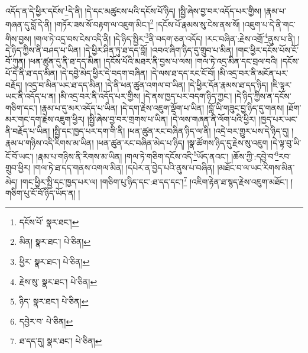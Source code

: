 འདོད་ན་དེ་ཕྱིར་དངོས་\footnote{དངོས་པོ་  སྣར་ཐང་། }དེ་ནི། །དེ་དང་མཚུངས་པའི་དངོས་པོ་ཉིད། །སྤྱི་ཞེས་བྱ་བར་འདོད་པར་གྱིས། །རྣམ་པ་གཞན་དུ་བློ་དེ་ནི། །གཏོར་ཟས་སོ་བརྟག་ལ་འཇུག་མིང་།\footnote{མིན།  སྣར་ཐང་།  པེ་ཅིན། } །དངོས་པོ་རྣམས་སུ་ངེས་ནས་སོ། །འཇུག་པ་དེ་ནི་གང་གིས་བྱས། །གལ་ཏེ་འདྲ་བས་ངེས་འདི་ནི། །དེ་ཉིད་སྤྱིར་\footnote{ཕྱིར་  སྣར་ཐང་།  པེ་ཅིན། }ནི་བདག་ཅན་འདོད། །རང་བཞིན་:རྗེས་འགྲོ་\footnote{རྗེས་སུ་  སྣར་ཐང་།  པེ་ཅིན། }ནུས་པ་ནི། །དེ་ཉིད་ཀྱིས་ནི་བཤད་པ་ཡིན། །དེ་ཕྱིར་ཤིན་ཏུ་ཐ་དད་བློ། །འབའ་ཞིག་ཉིད་དུ་གྲུབ་པ་མིན། །གང་ཕྱིར་དངོས་པོས་ངོ་བོ་ཀུན། །ཕན་ཚུན་དུ་ནི་ཐ་དད་མིན། །དངོས་པོའི་མཐར་ནི་བྱས་པ་ལས། །གལ་ཏེ་འདྲ་མིན་དང་བྲལ་བའི། །དངོས་པོ་དེ་ནི་ཐ་དད་མིན། །དེ་དབྱེ་མེད་ཕྱིར་དེ་བདག་བཞིན། །དེ་ལས་ཐ་དད་རང་ངོ་བོ། །མི་འདྲ་བར་ནི་མངོན་པར་བརྗོད། །འདྲ་བ་མིན་ཡང་ཐ་དད་མིན། །དེ་ནི་ཕན་ཚུན་འགལ་བ་ཡིན། །དེ་ཕྱིར་དོན་རྣམས་ཐ་དད་ཉིད། །ཇི་ལྟར་ཡང་ནི་འདོད་པ་ན། །མི་འདྲ་བར་ནི་འདོད་པར་གྱིས། །དེ་ནས་ཁྱད་པར་བདག་ཉིད་ཀྱང་། །དེ་ཉིད་ཀྱིས་ན་དངོས་གཅིག་དང་། །རྣམ་པ་དུ་མར་འདོད་པ་ཡིན། །དེ་དག་རྗེས་འཇུག་ལྡོག་པ་ཡིན། །བློ་ཡི་གཟུང་བྱ་ཉིད་དུ་གནས། །ཐོག་མར་གང་དག་རྗེས་འཇུག་ཕྱིར། །སྤྱི་ཞེས་བྱ་བར་གྲགས་པ་ཡིན། །དེ་ལས་གཞན་ནི་ལོག་པའི་ཕྱིར། །ཁྱད་པར་ཡང་ནི་བརྗོད་པ་ཡིན། །སྤྱི་དང་ཁྱད་པར་དག་གི་ནི། །ཕན་ཚུན་རང་བཞིན་ཉིད་ལ་ནི། །འདྲེ་བར་གྱུར་པས་དེ་ཉིད་དུ། །རྣམ་པ་གཉིས་འདི་རིགས་མ་ཡིན། །ཕན་ཚུན་རང་བཞིན་མེད་པ་ཉིད། །སྣ་ཚོགས་ཉིད་དུ་རྗེས་སུ་འཇུག །དེ་ལྟ་བུ་ཡི་ངོ་བོ་ཡང་། །རྣམ་པ་གཉིས་ནི་རིགས་མ་ཡིན། །གལ་ཏེ་གཅིག་དངོས་འདི་\footnote{ཉིད་  སྣར་ཐང་།  པེ་ཅིན། }ཡོད་ནའང་། །ཆོས་ཀྱི་:དབྱེ་བ་\footnote{དབྱེར་བ་  པེ་ཅིན། }རབ་གྲུབ་ཕྱིར། །གལ་ཏེ་ཐ་དད་གནས་འགལ་མིན། །དཔེར་ན་བྱེད་པའི་ནུས་པ་བཞིན། །མཐོང་བ་ལ་ཡང་རིགས་མིན་མེད། །གང་ཕྱིར་སྤྱི་དང་ཁྱད་པར་ལ། །གཅིག་པུ་ཉིད་དང་:ཐ་དད་དང་།\footnote{ཐ་དད་དུ།  སྣར་ཐང་།  པེ་ཅིན། } །འཇིག་རྟེན་ཐ་སྙད་རྗེས་འཇུག་མཐོང་། །གཅིག་པུ་ངོ་བོ་ཉིད་ཡོད་ན། །
